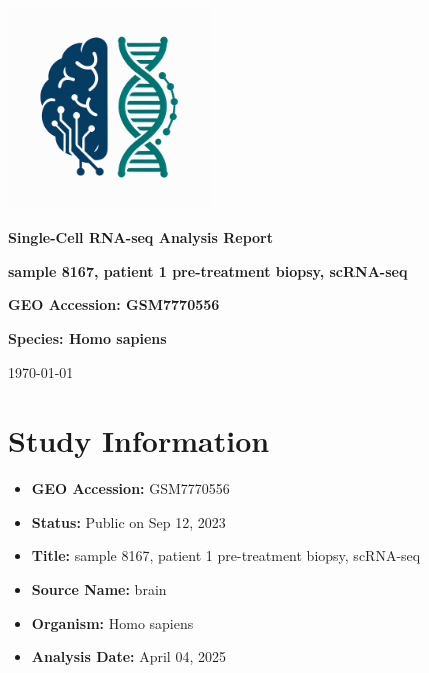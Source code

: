 \documentclass[12pt]{article}
\begin{document}
\begin{titlepage}
    \centering
    \vspace*{2cm}

    \includegraphics[width=0.4\textwidth]{scagentic_logo.png}
    \vspace{1cm}

    \Huge\textbf{Single-Cell RNA-seq Analysis Report}
    \vspace{1cm}

    \Large\textbf{sample 8167, patient 1 pre-treatment biopsy, scRNA-seq}
    \vspace{0.5cm}

    \Large\textbf{GEO Accession: GSM7770556}
    \vspace{0.5cm}

    \Large\textbf{Species: Homo sapiens}
    \vspace{0.5cm}
    \vspace{1cm}

    \large\today
\end{titlepage}

\tableofcontents
\newpage

\section{Study Information}
\begin{itemize}
    \item \textbf{GEO Accession:} GSM7770556
    \item \textbf{Status:} Public on Sep 12, 2023
    \item \textbf{Title:} sample 8167, patient 1 pre-treatment biopsy, scRNA-seq
    \item \textbf{Source Name:} brain
    \item \textbf{Organism:} Homo sapiens
    \item \textbf{Analysis Date:} {April 04, 2025}
\end{itemize}
\end{document}
